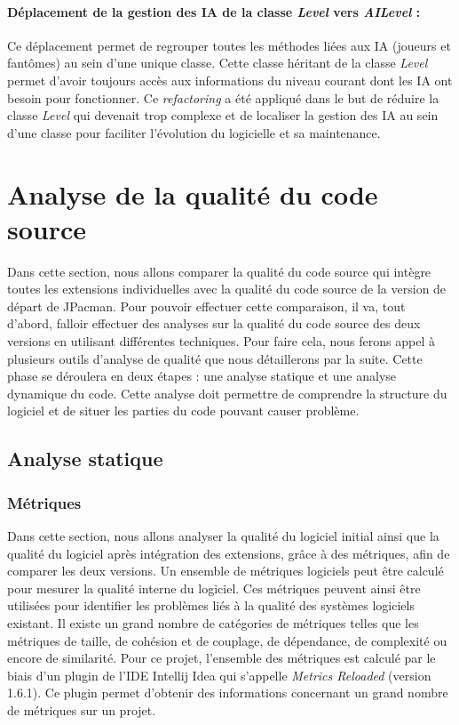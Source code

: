\documentclass[12pt, openany]{report}
\begin{document}
\paragraph{Déplacement de la gestion des IA de la classe \textit{Level} vers \textit{AILevel} : } Ce déplacement permet de regrouper toutes les méthodes liées aux IA (joueurs et fantômes) au sein d'une unique classe. Cette classe héritant de la classe \textit{Level} permet d'avoir toujours accès aux informations du niveau courant dont les IA ont besoin pour fonctionner. Ce \textit{refactoring} a été appliqué dans le but de réduire la classe \textit{Level} qui devenait trop complexe et de localiser la gestion des IA au sein d'une classe pour faciliter l'évolution du logicielle et sa maintenance.

\section{Analyse de la qualité du code source}

Dans cette section, nous allons comparer la qualité du code source qui intègre toutes les extensions individuelles avec la qualité du code source de la version de départ de JPacman. Pour pouvoir effectuer cette comparaison, il va, tout d'abord, falloir effectuer des analyses sur la qualité du code source des deux versions en utilisant différentes techniques. Pour faire cela, nous ferons appel à plusieurs outils d'analyse de qualité que nous détaillerons par la suite. Cette phase se déroulera en deux étapes : une analyse statique et une analyse dynamique du code. Cette analyse doit permettre de comprendre la structure du logiciel et de situer les parties du code pouvant causer problème.

\subsection{Analyse statique}

\subsubsection{Métriques}

Dans cette section, nous allons analyser la qualité du logiciel initial ainsi que la qualité du logiciel après intégration des extensions, grâce à des métriques, afin de comparer les deux versions. Un ensemble de métriques logiciels peut être calculé pour mesurer la qualité interne du logiciel. Ces métriques peuvent ainsi être utilisées pour identifier les problèmes liés à la qualité des systèmes logiciels existant. Il existe un grand nombre de catégories de métriques telles que les métriques de taille, de cohésion et de couplage, de dépendance, de complexité ou encore de similarité. Pour ce projet, l'ensemble des métriques est calculé par le biais d'un plugin de l'IDE Intellij Idea qui s'appelle \textit{Metrics Reloaded} (version 1.6.1). Ce plugin permet d'obtenir des informations concernant un grand nombre de métriques sur un projet. \\
\end{document}
